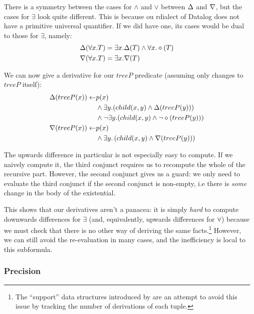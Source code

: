 There is a symmetry between the cases for $\wedge$ and $\vee$ between $\Delta$
and $\nabla$, but the cases for $\exists$ look quite different.
This is because ou rdialect of Datalog does not have a primitive universal quantifier.
If we did have one, its cases would be dual to those for $\exists$, namely:
\begin{align*}
\Delta(\forall x.T) &= \exists x. \Delta(T) \wedge \forall x. \diamond(T)\\
\nabla(\forall x.T) &= \exists x. \nabla(T)
\end{align*}

We can now give a derivative for our $treeP$ predicate (assuming only changes to
$treeP$ itself):
\begin{align*}
  \Delta(treeP(x)) \leftarrow & p(x)\\
    &\wedge
    \exists y. (
      child(x, y)
      \wedge
      \Delta(treeP(y))
    )\\
    &\wedge 
    \neg \exists y. (
      child(x, y)
      \wedge
      \neg \diamond(treeP(y))
    )\\
  \nabla(treeP(x)) \leftarrow & p(x)\\
  &\wedge \exists y. \left( child(x, y) \wedge \nabla(treeP(y)) \right)
\end{align*}

The upwards difference in particular is not especially easy to compute. If we naively compute it, the
third conjunct requires us to recompute the whole of the recursive part. However,
the second conjunct gives us a
guard: we only need to evaluate the third conjunct if the second conjunct is
non-empty, i.e there is \emph{some} change in the body of the existential.

This shows that our derivatives aren't a panacea: it is simply \emph{hard} to compute
downwards differences for $\exists$ (and, equivalently, upwards differences for
$\forall$) because we must check that there is no other way of deriving the same
facts.\footnote{The ``support'' data structures introduced by
  \autocite{gupta1993maintaining} are an attempt to avoid this issue by
  tracking the number of derivations of each tuple.} However, we can still avoid
the re-evaluation in many cases, and the inefficiency is local to this subformula.

\subsubsection{Precision}

